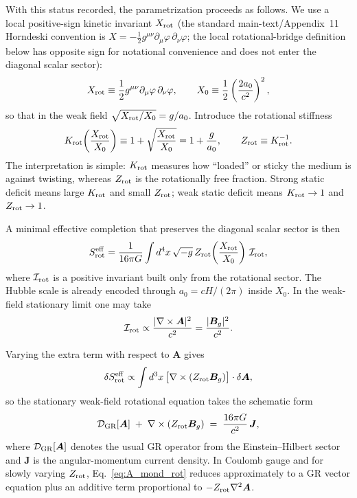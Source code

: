 \documentclass[11pt]{article}
\begin{document}
With this status recorded, the parametrization proceeds as follows. We use a local positive-sign kinetic invariant $X_{\rm rot}$ (the standard main-text/Appendix~11 Horndeski convention is $X = -\tfrac{1}{2}g^{\mu\nu}\partial_\mu\varphi\,\partial_\nu\varphi$; the local rotational-bridge definition below has opposite sign for notational convenience and does not enter the diagonal scalar sector):
\begin{equation}
X_{\rm rot} \equiv \frac12 g^{\mu\nu}\partial_\mu\phi\,\partial_\nu\phi,
\qquad
X_0 \equiv \frac12\left(\frac{2a_0}{c^2}\right)^2,
\label{eq:Xdef_rot}
\end{equation}
so that in the weak field $\sqrt{X_{\rm rot}/X_0}=g/a_0$. Introduce the rotational stiffness
\begin{equation}
K_{\rm rot}\!\left(\frac{X_{\rm rot}}{X_0}\right) \equiv 1+\sqrt{\frac{X_{\rm rot}}{X_0}}
= 1+\frac{g}{a_0},
\qquad
Z_{\rm rot} \equiv K_{\rm rot}^{-1}.
\label{eq:Krot}
\end{equation}
The interpretation is simple: $K_{\rm rot}$ measures how ``loaded'' or sticky the medium is against twisting, whereas $Z_{\rm rot}$ is the rotationally free fraction. Strong static deficit means large $K_{\rm rot}$ and small $Z_{\rm rot}$; weak static deficit means $K_{\rm rot}\to 1$ and $Z_{\rm rot}\to 1$.

A minimal effective completion that preserves the diagonal scalar sector is then
\begin{equation}
S_{\rm rot}^{\rm eff}
= \frac{1}{16\pi G}\int d^4x\,\sqrt{-g}\,
Z_{\rm rot}\!\left(\frac{X_{\rm rot}}{X_0}\right)\,\mathcal I_{\rm rot},
\label{eq:Srot_eff}
\end{equation}
where $\mathcal I_{\rm rot}$ is a positive invariant built only from the rotational sector. The Hubble scale is already encoded through $a_0=cH/(2\pi)$ inside $X_0$. In the weak-field stationary limit one may take
\begin{equation}
\mathcal I_{\rm rot}\propto \frac{|\nabla\times \bm{A}|^2}{c^2}
= \frac{|\bm{B}_g|^2}{c^2}.
\label{eq:Irot_wf}
\end{equation}

Varying the extra term with respect to $\bm{A}$ gives
\begin{equation}
\delta S_{\rm rot}^{\rm eff}
\propto
\int d^3x\,
\bigl[\nabla\times(Z_{\rm rot}\bm{B}_g)\bigr]\cdot \delta\bm{A},
\end{equation}
so the stationary weak-field rotational equation takes the schematic form
\begin{equation}
\mathcal D_{\rm GR}[\bm{A}]
\;+\;
\nabla\times(Z_{\rm rot}\bm{B}_g)
\;=\;
\frac{16\pi G}{c^2}\,\bm{J},
\label{eq:A_mond_rot}
\end{equation}
where $\mathcal D_{\rm GR}[\bm{A}]$ denotes the usual GR operator from the Einstein--Hilbert sector and $\bm{J}$ is the angular-momentum current density. In Coulomb gauge and for slowly varying $Z_{\rm rot}$, Eq.~\eqref{eq:A_mond_rot} reduces approximately to a GR vector equation plus an additive term proportional to $-Z_{\rm rot}\nabla^2\bm{A}$.
\end{document}
